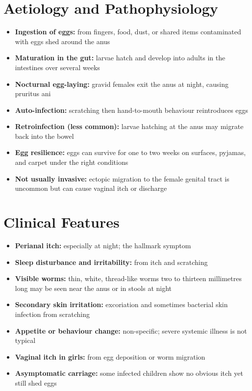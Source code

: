 \section*{Aetiology and Pathophysiology}
\begin{itemize}
    \item \textbf{Ingestion of eggs:} from fingers, food, dust, or shared items contaminated with eggs shed around the anus
    \item \textbf{Maturation in the gut:} larvae hatch and develop into adults in the intestines over several weeks
    \item \textbf{Nocturnal egg-laying:} gravid females exit the anus at night, causing pruritus ani
    \item \textbf{Auto-infection:} scratching then hand-to-mouth behaviour reintroduces eggs
    \item \textbf{Retroinfection (less common):} larvae hatching at the anus may migrate back into the bowel
    \item \textbf{Egg resilience:} eggs can survive for one to two weeks on surfaces, pyjamas, and carpet under the right conditions
    \item \textbf{Not usually invasive:} ectopic migration to the female genital tract is uncommon but can cause vaginal itch or discharge
\end{itemize}

\section*{Clinical Features}
\begin{itemize}
    \item \textbf{Perianal itch:} especially at night; the hallmark symptom
    \item \textbf{Sleep disturbance and irritability:} from itch and scratching
    \item \textbf{Visible worms:} thin, white, thread-like worms two to thirteen millimetres long may be seen near the anus or in stools at night
    \item \textbf{Secondary skin irritation:} excoriation and sometimes bacterial skin infection from scratching
    \item \textbf{Appetite or behaviour change:} non-specific; severe systemic illness is not typical
    \item \textbf{Vaginal itch in girls:} from egg deposition or worm migration
    \item \textbf{Asymptomatic carriage:} some infected children show no obvious itch yet still shed eggs
\end{itemize}

